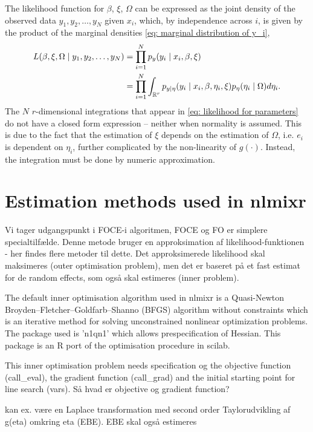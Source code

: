 The likelihood function for $\beta$, $\xi$, $\Omega$ can be expressed as the joint density of the observed data $y_1,y_2,\dots,y_N$ given $x_i$, which, by independence across $i$, is given by the product of the marginal densities \eqref{eq: marginal distribution of y_i},
\begin{align}
    L(\beta,\xi,\Omega\mid  y_1,y_2,\dots,y_N)&=\prod_{i=1}^N  p_y(y_i\mid x_i,\beta,\xi)  \nonumber \\&=\prod_{i=1}^N\int_{\mathbb{R}^r} p_{y\mid \eta}(y_i\mid x_i,\beta,\eta_i,\xi)p_\eta(\eta_i\mid  \Omega)d\eta_i.\label{eq: likelihood for parameters}
\end{align}
The $N$ $r$-dimensional integrations that appear in \eqref{eq: likelihood for parameters} do not have a closed form expression -- neither when normality is assumed. This is due to the fact that the estimation of $\xi$ depends on the estimation of $\Omega$, i.e. $e_i$ is dependent on $\eta_i$, further complicated by the non-linearity of $g(\cdot)$. Instead, the integration must be done by numeric approximation.

\section{Estimation methods used in nlmixr}
Vi tager udgangspunkt i FOCE-i algoritmen, FOCE og FO er simplere specialtilfælde. Denne metode bruger en approksimation af likelihood-funktionen - her findes flere metoder til dette. Det approksimerede likelihood skal maksimeres (outer optimisation problem), men det er baseret på et fast estimat for de random effects, som også skal estimeres (inner problem). 

The default inner optimisation algorithm used in nlmixr is a Quasi-Newton Broyden–Fletcher–Goldfarb–Shanno (BFGS) algorithm without constraints which is an iterative method for solving unconstrained nonlinear optimization problems. The package used is 'n1qn1' which allows prespecification of Hessian. This package is an R port of the optimisation procedure in scilab.


This inner optimisation problem needs specification og the objective function (call\_eval), the gradient function (call\_grad) and the initial starting point for line search (vars). Så hvad er objective og gradient function?

kan ex. være en Laplace transformation med second order Taylorudvikling af g(eta) omkring eta (EBE). EBE skal også estimeres 


